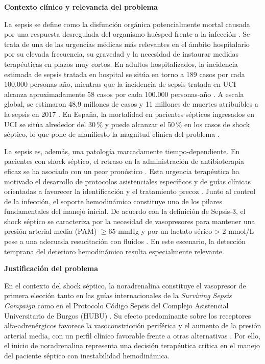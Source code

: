 
\textbf{Contexto clínico y relevancia del problema}

La sepsis se define como la disfunción orgánica potencialmente mortal causada por una respuesta desregulada del organismo huésped frente a la infección \cite{singer2016}. Se trata de una de las urgencias médicas más relevantes en el ámbito hospitalario por su elevada frecuencia, su gravedad y la necesidad de instaurar medidas terapéuticas en plazos muy cortos. En adultos hospitalizados, la incidencia estimada de sepsis tratada en hospital se sitúa en torno a 189 casos por cada 100.000 personas-año, mientras que la incidencia de sepsis tratada en UCI alcanza aproximadamente 58 casos por cada 100.000 personas-año \cite{fleischmann2020}. A escala global, se estimaron 48,9 millones de casos y 11 millones de muertes atribuibles a la sepsis en 2017 \cite{fleischmann2020}. En España, la mortalidad en pacientes sépticos ingresados en UCI se sitúa alrededor del 30\,\% y puede alcanzar el 50\,\% en los casos de shock séptico, lo que pone de manifiesto la magnitud clínica del problema \cite{hubu2025}.

La sepsis es, además, una patología marcadamente tiempo-dependiente. En pacientes con shock séptico, el retraso en la administración de antibioterapia eficaz se ha asociado con un peor pronóstico \cite{kumar2006}. Esta urgencia terapéutica ha motivado el desarrollo de protocolos asistenciales específicos y de guías clínicas orientadas a favorecer la identificación y el tratamiento precoz \cite{evans2021}. Junto al control de la infección, el soporte hemodinámico constituye uno de los pilares fundamentales del manejo inicial. De acuerdo con la definición de Sepsis-3, el shock séptico se caracteriza por la necesidad de vasopresores para mantener una presión arterial media (PAM) $\geq 65$ mmHg y por un lactato sérico > 2 mmol/L pese a una adecuada resucitación con fluidos \cite{singer2016}. En este escenario, la detección temprana del deterioro hemodinámico resulta especialmente relevante.

\textbf{Justificación del problema}

En el contexto del shock séptico, la noradrenalina constituye el vasopresor de primera elección tanto en las guías internacionales de la \textit{Surviving Sepsis Campaign} como en el Protocolo Código Sepsis del Complejo Asistencial Universitario de Burgos (HUBU) \cite{evans2021,hubu2025}. Su efecto predominante sobre los receptores alfa-adrenérgicos favorece la vasoconstricción periférica y el aumento de la presión arterial media, con un perfil clínico favorable frente a otras alternativas \cite{evans2021}. Por ello, el inicio de noradrenalina representa una decisión terapéutica crítica en el manejo del paciente séptico con inestabilidad hemodinámica.

